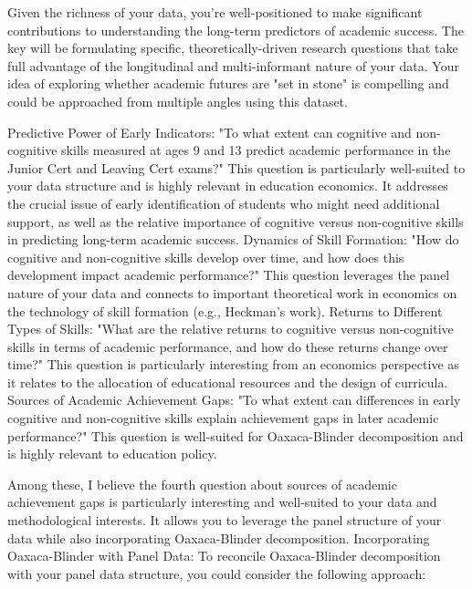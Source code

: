 \documentclass[12pt,a4paper,onecolumn]{article}
\numberwithin{equation}{section}
\begin{document}
Given the richness of your data, you're well-positioned to make significant contributions to understanding the long-term predictors of academic success. The key will be formulating specific, theoretically-driven research questions that take full advantage of the longitudinal and multi-informant nature of your data. Your idea of exploring whether academic futures are "set in stone" is compelling and could be approached from multiple angles using this dataset.


Predictive Power of Early Indicators:
"To what extent can cognitive and non-cognitive skills measured at ages 9 and 13 predict academic performance in the Junior Cert and Leaving Cert exams?"
This question is particularly well-suited to your data structure and is highly relevant in education economics. It addresses the crucial issue of early identification of students who might need additional support, as well as the relative importance of cognitive versus non-cognitive skills in predicting long-term academic success.
Dynamics of Skill Formation:
"How do cognitive and non-cognitive skills develop over time, and how does this development impact academic performance?"
This question leverages the panel nature of your data and connects to important theoretical work in economics on the technology of skill formation (e.g., Heckman's work).
Returns to Different Types of Skills:
"What are the relative returns to cognitive versus non-cognitive skills in terms of academic performance, and how do these returns change over time?"
This question is particularly interesting from an economics perspective as it relates to the allocation of educational resources and the design of curricula.
Sources of Academic Achievement Gaps:
"To what extent can differences in early cognitive and non-cognitive skills explain achievement gaps in later academic performance?"
This question is well-suited for Oaxaca-Blinder decomposition and is highly relevant to education policy.

Among these, I believe the fourth question about sources of academic achievement gaps is particularly interesting and well-suited to your data and methodological interests. It allows you to leverage the panel structure of your data while also incorporating Oaxaca-Blinder decomposition.
Incorporating Oaxaca-Blinder with Panel Data:
To reconcile Oaxaca-Blinder decomposition with your panel data structure, you could consider the following approach:
\end{document}

